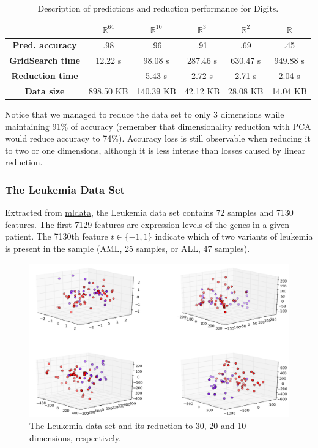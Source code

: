 \documentclass[12pt]{article}
\begin{document}
\begin{table}[H]
	\centering
	\begin{tabular}{|c|c|c|c|c|c|}
		\hline
		& \textbf{$\mathbb{R}^{64}$} & \textbf{$\mathbb{R}^{10}$} & \textbf{$\mathbb{R}^3$} & \textbf{$\mathbb{R}^2$} & \textbf{$\mathbb{R}$} \\\hline
		\textbf{Pred. accuracy}   & .98 & .96 & .91 & .69 & .45 \\\hline
		\textbf{GridSearch time} & 12.22 s & 98.08 s & 287.46 s & 630.47 s & 949.88 s \\\hline
		\textbf{Reduction time}  & - & 5.43 s & 2.72 s & 2.71 s & 2.04 s \\\hline
		\textbf{Data size} & 898.50 KB & 140.39 KB & 42.12 KB & 28.08 KB & 14.04 KB \\\hline
	\end{tabular}

	\caption{Description of predictions and reduction performance for Digits.}
\end{table}

Notice that we managed to reduce the data set to only 3 dimensions while maintaining 91\% of accuracy (remember that dimensionality reduction with PCA would reduce accuracy to 74\%). Accuracy loss is still observable when reducing it to two or one dimensions, although it is less intense than losses caused by linear reduction.

\newpage
\subsubsection{The Leukemia Data Set}

Extracted from \href{http://mldata.com}{mldata}, the Leukemia data set contains 72 samples and 7130 features. The first 7129 features are expression levels of the genes in a given patient. The 7130th feature $t \in \{-1, 1\}$ indicate which of two variants of leukemia is present in the sample (AML, 25 samples, or ALL, 47 samples). \cite{on:duc_ds}

\begin{figure}[H]
	\centering
	\includegraphics[width=\linewidth]{img/experiments/2_7_leukemia_isomap}
	\captionsetup{justification=centering}
	\caption{The Leukemia data set and its reduction to 30, 20 and 10 dimensions, respectively.}
	\label{fig:leukemiads}
\end{figure}
\end{document}
